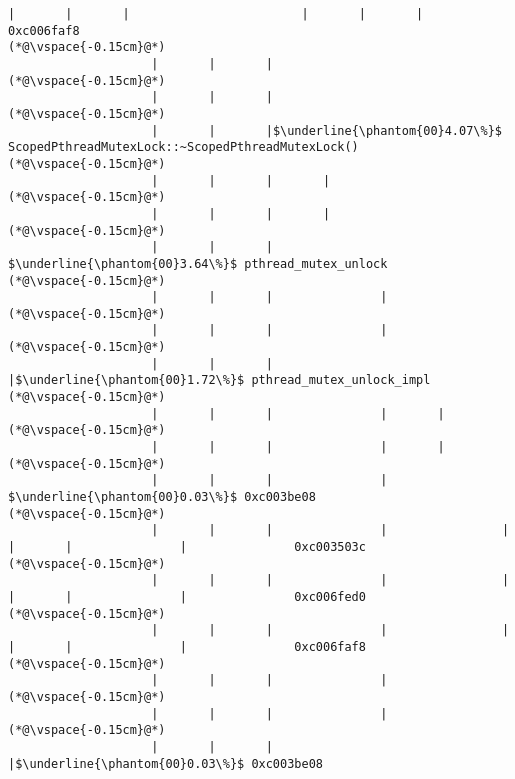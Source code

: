 \begin{lstlisting}[caption=Unicode-merkkijonon kopiointi C$\to$Java, label=profile:C2JCopyUnicode-512, numberbychapter=true, frame=lines, float, floatplacement=t]
                    |       |       |                        |       |       |                       0xc006faf8
(*@\vspace{-0.15cm}@*)
                    |       |       |
(*@\vspace{-0.15cm}@*)
                    |       |       |
(*@\vspace{-0.15cm}@*)
                    |       |       |$\underline{\phantom{00}4.07\%}$ ScopedPthreadMutexLock::~ScopedPthreadMutexLock()
(*@\vspace{-0.15cm}@*)
                    |       |       |       |
(*@\vspace{-0.15cm}@*)
                    |       |       |       |
(*@\vspace{-0.15cm}@*)
                    |       |       |        $\underline{\phantom{00}3.64\%}$ pthread_mutex_unlock
(*@\vspace{-0.15cm}@*)
                    |       |       |               |
(*@\vspace{-0.15cm}@*)
                    |       |       |               |
(*@\vspace{-0.15cm}@*)
                    |       |       |               |$\underline{\phantom{00}1.72\%}$ pthread_mutex_unlock_impl
(*@\vspace{-0.15cm}@*)
                    |       |       |               |       |
(*@\vspace{-0.15cm}@*)
                    |       |       |               |       |
(*@\vspace{-0.15cm}@*)
                    |       |       |               |        $\underline{\phantom{00}0.03\%}$ 0xc003be08
(*@\vspace{-0.15cm}@*)
                    |       |       |               |                |       |       |               |               0xc003503c
(*@\vspace{-0.15cm}@*)
                    |       |       |               |                |       |       |               |               0xc006fed0
(*@\vspace{-0.15cm}@*)
                    |       |       |               |                |       |       |               |               0xc006faf8
(*@\vspace{-0.15cm}@*)
                    |       |       |               |
(*@\vspace{-0.15cm}@*)
                    |       |       |               |
(*@\vspace{-0.15cm}@*)
                    |       |       |               |$\underline{\phantom{00}0.03\%}$ 0xc003be08

\end{lstlisting}
